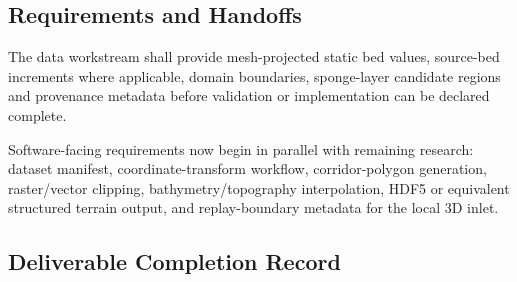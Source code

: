 \subsection{Requirements and Handoffs}
\label{sec:res-dat-geo-requirements}


The data workstream shall provide mesh-projected static bed values,
source-bed increments where applicable, domain boundaries, sponge-layer
candidate regions and provenance metadata before validation or
implementation can be declared complete.

Software-facing requirements now begin in parallel with remaining
research: dataset manifest, coordinate-transform workflow,
corridor-polygon generation, raster/vector clipping,
bathymetry/topography interpolation, HDF5 or equivalent structured
terrain output, and replay-boundary metadata for the local 3D inlet.

\subsection{Deliverable Completion Record}
\label{sec:res-dat-geo-completion-record}

%
%
%
